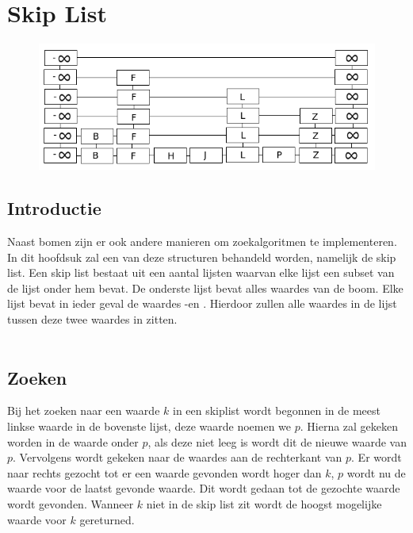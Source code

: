 \chapter{Skip List}
\label{sec:Hoofdstuk 6}

\begin{figure}[h]
	\centering
		\includegraphics[width=\textwidth]{chap6/skiplist}
	\label{fig:skiplist}
\end{figure}

\section{Introductie}
Naast bomen zijn er ook andere manieren om zoekalgoritmen te implementeren. In dit hoofdsuk zal een van deze structuren behandeld worden, namelijk de skip list. Een skip list bestaat uit een aantal lijsten waarvan elke lijst een subset van de lijst onder hem bevat. De onderste lijst bevat alles waardes van de boom. Elke lijst bevat in ieder geval de waardes -\infty en \infty. Hierdoor zullen alle waardes in de lijst tussen deze twee waardes in zitten.\\
\\
\section{Zoeken}
Bij het zoeken naar een waarde $k$ in een skiplist wordt begonnen in de meest linkse waarde in de bovenste lijst, deze waarde noemen we $p$. Hierna zal gekeken worden in de waarde onder $p$, als deze niet leeg is wordt dit de nieuwe waarde van $p$. Vervolgens wordt gekeken naar de waardes aan de rechterkant van $p$. Er wordt naar rechts gezocht tot er een waarde gevonden wordt hoger dan $k$, $p$ wordt nu de waarde voor de laatst gevonde waarde. Dit wordt gedaan tot de gezochte waarde wordt gevonden. Wanneer $k$ niet in de skip list zit wordt de hoogst mogelijke waarde voor $k$ gereturned.\\
\\
